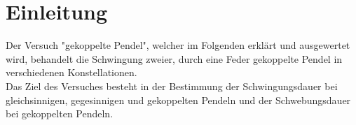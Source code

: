 \section{Einleitung}
\label{sec:Einleitung}
Der Versuch "gekoppelte Pendel", welcher im Folgenden erklärt und ausgewertet wird, behandelt
die Schwingung zweier, durch eine Feder gekoppelte Pendel in verschiedenen Konstellationen.
\\
Das Ziel des Versuches besteht in der Bestimmung der Schwingungsdauer bei gleichsinnigen, gegesinnigen und gekoppelten Pendeln
und der Schwebungsdauer bei gekoppelten Pendeln.
